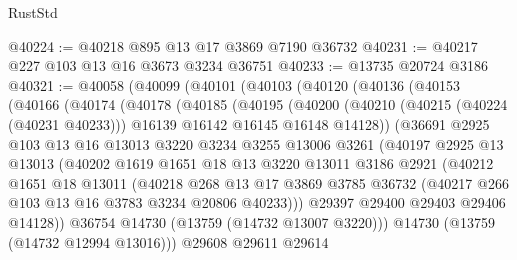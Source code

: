 \begin{lexlean}{RustStd}
\begin{coremodule}
@40224 := @40218 @895 @13 @17 @3869 @7190 @36732
@40231 := @40217 @227 @103 @13 @16 @3673 @3234 @36751
@40233 := @13735 @20724 @3186
@40321 := @40058
    (@40099
      (@40101
        (@40103
          (@40120
            (@40136
              (@40153
                (@40166
                  (@40174
                    (@40178
                      (@40185
                        (@40195
                          (@40200
                            (@40210
                              (@40215 (@40224 (@40231 @40233)))
                              @16139
                              @16142
                              @16145
                              @16148
                              @14128))
                          (@36691
                            @2925
                            @103
                            @13
                            @16
                            @13013
                            @3220
                            @3234
                            @3255
                            @13006
                            @3261
                            (@40197
                              @2925
                              @13
                              @13013
                              (@40202
                                @1619
                                @1651
                                @18
                                @13
                                @3220
                                @13011
                                @3186
                                @2921
                                (@40212
                                  @1651
                                  @18
                                  @13011
                                  (@40218
                                    @268
                                    @13
                                    @17
                                    @3869
                                    @3785
                                    @36732
                                    (@40217 @266 @103 @13 @16 @3783 @3234 @20806 @40233)))
                                @29397
                                @29400
                                @29403
                                @29406
                                @14128))
                            @36754
                            @14730
                            (@13759 (@14732 @13007 @3220)))
                          @14730
                          (@13759 (@14732 @12994 @13016)))
                        @29608
                        @29611
                        @29614

\end{coremodule}
\end{lexlean}

